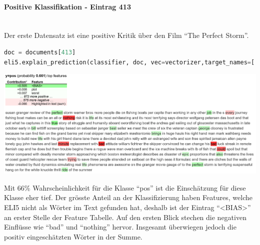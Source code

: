 \documentclass[
  12pt, %
  a4paper, %
  oneside, %
  openany, 
  numbers=noenddot, %
  BCOR=5mm, %
  parskip=half*, %
  thesis, %
]{bfhbook}
\newcommand{\parag}[1]{\paragraph*{#1}\mbox{}\\}
\begin{document}
\parag{Positive Klassifikation - Eintrag 413}
Der erste Datensatz ist eine positive Kritik über den Film ``The Perfect Storm''.
\begin{lstlisting}[language=Python]
doc = documents[413]
eli5.explain_prediction(classifier, doc, vec=vectorizer,target_names=['neg','pos'], top=20)
\end{lstlisting}
\label{eli5413}

\begin{center}
\begin{minipage}[t]{\linewidth}
\includegraphics[width=\textwidth]{Bilder/MovieReviews-SentimentClassification_ELI5-413.PNG}
\end{minipage}
\end{center}

Mit 66\% Wahrscheinlichkeit für die Klasse ``pos'' ist die Einschätzung für diese Klasse eher tief. Der grösste Anteil an der Klassifizierung haben Features, welche ELI5 nicht als Wörter im Text gefunden hat, deshalb ist der Eintrag ``<BIAS>'' an erster Stelle der Feature Tabelle. Auf den ersten Blick stechen die negativen Einflüsse wie ``bad'' und ``nothing'' hervor. Insgesamt überwiegen jedoch die positiv eingeschätzten Wörter in der Summe.
\end{document}

